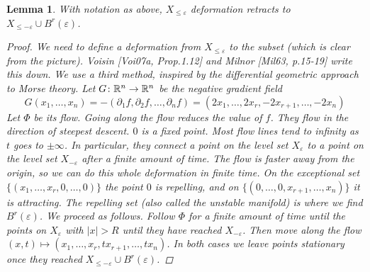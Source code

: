 \documentclass[A4paper, british, reqno]{amsart}
\theoremstyle{darkgreentheorem}
\newtheorem{lm}[thm]{Lemma}
\theoremstyle{darkbluedefinition}
\theoremstyle{darkredexample}
\theoremstyle{remark}
\newcommand{\1}{\mathbbm{1}}
\begin{document}
\begin{lm}
    With notation as above, $X_{\leqslant \varepsilon}$ deformation retracts to $X_{\leqslant -\varepsilon }\cup B^{r}(\varepsilon)$.
    \begin{proof}
	We need to define a deformation from $X_{\leqslant \varepsilon}$ to the subset (which is clear from the picture).
	Voisin [Voi07a, Prop.1.12] and Milnor [Mil63, p.15-19] write this down.
	We use a third method, inspired by the differential geometric approach to Morse theory.
	Let $G\colon \mathbb{R}^{n}\to \mathbb{R}^{n}$ be the negative gradient field
	\[ G(x_{1},\ldots,x_{n})=-(\partial_{1} f,\partial_{2} f,\ldots, \partial_{n} f)=(2x_{1},\ldots,2x_{r},-2x_{r+1},\ldots,-2x_{n}) \]
	Let $\Phi$ be its flow.
	Going along the flow reduces the value of $f$.
	They flow in the direction of steepest descent.
	$0$ is a fixed point.
	Most flow lines tend to infinity as $t$ goes to $\pm \infty$.
	In particular, they connect a point on the level set $X_{\varepsilon}$ to a point on the level set $X_{-\varepsilon}$ after a finite amount of time.
	The flow is faster away from the origin, so we can do this whole deformation in finite time.
	On the exceptional set $\{(x_{1},\ldots,x_{r},0,\ldots,0)\}$ the point $0$ is repelling, and on $\{ (0,\ldots,0,x_{r+1},\ldots,x_{n})\}$ it is attracting.
	The repelling set (also called the \textit{unstable} manifold) is where we find $B^{r}(\varepsilon)$.
	We proceed as follows.
	Follow $\Phi$ for a finite amount of time until the points on $X_{\varepsilon}$ with $|x|>R$ until they have reached $X_{-\varepsilon}$.
	Then move along the flow $(x,t)\mapsto (x_{1},\ldots,x_{r},tx_{r+1},\ldots,tx_{n})$.
	In both cases we leave points stationary once they reached $X_{\leqslant -\varepsilon }\cup B^{r}(\varepsilon)$.
    \end{proof}
\end{lm}
\end{document}
